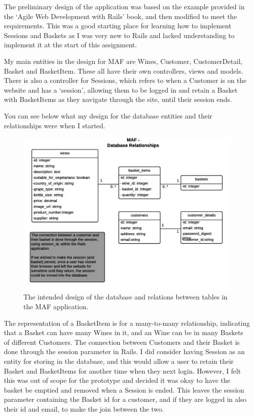 \documentclass[12pt]{article}
\begin{document}
The preliminary design of the application was based on the example provided in the `Agile Web Development with Rails'\cite{railsbook} book, and then modified to meet the requirements. This was a good starting place for learning how to implement Sessions and Baskets as I was very new to Rails and lacked understanding to implement it at the start of this assignment.

My main entities in the design for MAF are Wines, Customer, CustomerDetail, Basket and BasketItem. These all have their own controllers, views and models. There is also a controller for Sessions, which refers to when a Customer is on the website and has a `session', allowing them to be logged in and retain a Basket with BasketItems as they navigate through the site, until their session ends.

You can see below what my design for the database entities and their relationships were when I started.

\begin{figure}[H]
        \centering
                \includegraphics[width=1\textwidth]{assets/MAF_Database_relationships}
                \caption{The intended design of the database and relations between tables in the MAF application.}
                \label{fig: Intended MAF Database relationships.} 
\end{figure}

The representation of a BasketItem is for a many-to-many relationship, indicating that a Basket can have many Wines in it, and an Wine can be in many Baskets of different Customers. The connection between Customers and their Basket is done through the session parameter in Rails. I did consider having Session as an entity for storing in the database, and this would allow a user to retain their Basket and BasketItems for another time when they next login. However, I felt this was out of scope for the prototype and decided it was okay to have the basket be emptied and removed when a Session is ended. This leaves the session parameter containing the Basket id for a customer, and if they are logged in also their id and email, to make the join between the two.
\end{document}
